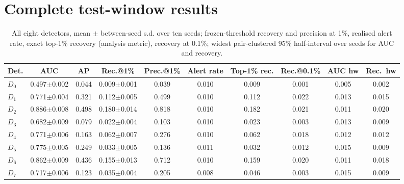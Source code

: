 \documentclass[conference]{IEEEtran}
\begin{document}
\section{Complete test-window results}
\begin{table}[t]\caption{All eight detectors, mean $\pm$ between-seed s.d. over ten seeds; frozen-threshold recovery and precision at 1\%, realised alert rate, exact top-1\% recovery (analysis metric), recovery at 0.1\%; widest pair-clustered 95\% half-interval over seeds for AUC and recovery.}\label{tab:full}\centering\scriptsize\setlength{\tabcolsep}{2.5pt}
\begin{tabular}{@{}lccccccccc@{}}\toprule
Det. & AUC & AP & Rec.@1\% & Prec.@1\% & Alert rate & Top-1\% rec. & Rec.@0.1\% & AUC hw & Rec.\ hw \\\midrule
$D_0$ & 0.497$\pm$0.002 & 0.044 & 0.009$\pm$0.001 & 0.039 & 0.010 & 0.009 & 0.001 & 0.005 & 0.002 \\
$D_1$ & 0.771$\pm$0.004 & 0.321 & 0.112$\pm$0.005 & 0.499 & 0.010 & 0.112 & 0.022 & 0.013 & 0.015 \\
$D_2$ & 0.886$\pm$0.008 & 0.498 & 0.180$\pm$0.014 & 0.818 & 0.010 & 0.182 & 0.021 & 0.011 & 0.020 \\
$D_3$ & 0.682$\pm$0.009 & 0.079 & 0.022$\pm$0.004 & 0.103 & 0.010 & 0.023 & 0.003 & 0.013 & 0.009 \\
$D_4$ & 0.771$\pm$0.006 & 0.163 & 0.062$\pm$0.007 & 0.276 & 0.010 & 0.062 & 0.018 & 0.012 & 0.012 \\
$D_5$ & 0.775$\pm$0.005 & 0.249 & 0.033$\pm$0.005 & 0.136 & 0.011 & 0.032 & 0.012 & 0.015 & 0.009 \\
$D_6$ & 0.862$\pm$0.009 & 0.436 & 0.155$\pm$0.013 & 0.712 & 0.010 & 0.159 & 0.020 & 0.011 & 0.018 \\
$D_7$ & 0.717$\pm$0.006 & 0.123 & 0.035$\pm$0.004 & 0.205 & 0.008 & 0.046 & 0.003 & 0.015 & 0.009 \\
\bottomrule\end{tabular}\end{table}
\end{document}
